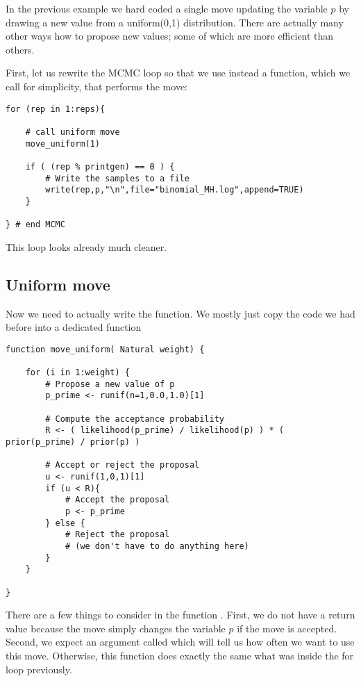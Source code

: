 In the previous example we hard coded a single move updating the variable $p$ by drawing a new value from a uniform(0,1) distribution.
There are actually many other ways how to propose new values; some of which are more efficient than others.

First, let us rewrite the MCMC loop so that we use instead a function, which we call  for simplicity, that performs the move:
{\tt \begin{snugshade*}
\begin{lstlisting}    
for (rep in 1:reps){
    
    # call uniform move
    move_uniform(1)
    
    if ( (rep % printgen) == 0 ) {
        # Write the samples to a file
        write(rep,p,"\n",file="binomial_MH.log",append=TRUE)
    }

} # end MCMC
\end{lstlisting}
\end{snugshade*}}
This loop looks already much cleaner.

\subsection{Uniform move}
Now we need to actually write the  function.
We mostly just copy the code we had before into a dedicated function
{\tt \begin{snugshade*}
\begin{lstlisting}    
function move_uniform( Natural weight) {

    for (i in 1:weight) {
        # Propose a new value of p
        p_prime <- runif(n=1,0.0,1.0)[1]

        # Compute the acceptance probability
        R <- ( likelihood(p_prime) / likelihood(p) ) * ( prior(p_prime) / prior(p) )
    
        # Accept or reject the proposal
        u <- runif(1,0,1)[1]
        if (u < R){
            # Accept the proposal
            p <- p_prime
        } else {
            # Reject the proposal
            # (we don't have to do anything here)
        }
    }
    
}
\end{lstlisting}
\end{snugshade*}}
There are a few things to consider in the function .
First, we do not have a return value because the move simply changes the variable $p$ if the move is accepted.
Second, we expect an argument called  which will tell us how often we want to use this move.
Otherwise, this function does exactly the same what was inside the for loop previously.

